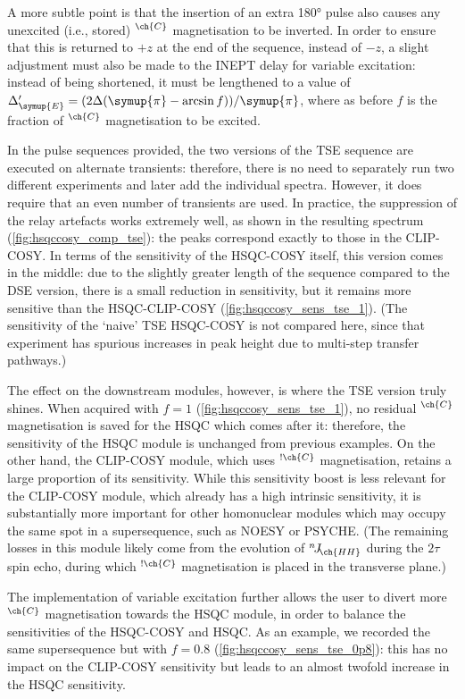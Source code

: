 \documentclass[a4paper,12pt]{article}
\newcommand{\DeltaE}{\Delta_{\symup{E}}}
\newcommand{\magn}[1]{\ch{^1H}$^{\ch{#1}}$}
\newcommand{\magnnot}[1]{\ch{^1H}$^{!\ch{#1}}$}
\newcommand{\nJ}[1]{{}^{n}\!J_{\!\ch{#1}}}
\newcommand{\cpi}{\symup{\pi}}
\begin{document}
\begin{refsection}
A more subtle point is that the insertion of an extra \ang{180} pulse also causes any unexcited (i.e., stored) \magn{C} magnetisation to be inverted.
In order to ensure that this is returned to $+z$ at the end of the sequence, instead of $-z$, a slight adjustment must also be made to the INEPT delay for variable excitation: instead of being shortened, it must be lengthened to a value of $\DeltaE' = (2\Delta (\cpi - \arcsin f))/\cpi$, where as before $f$ is the fraction of \magn{C} magnetisation to be excited.

In the pulse sequences provided, the two versions of the TSE sequence are executed on alternate transients: therefore, there is no need to separately run two different experiments and later add the individual spectra.
However, it does require that an even number of transients are used.
In practice, the suppression of the relay artefacts works extremely well, as shown in the resulting spectrum (\cref{fig:hsqccosy_comp_tse}): the peaks correspond exactly to those in the CLIP-COSY.
In terms of the sensitivity of the HSQC-COSY itself, this version comes in the middle: due to the slightly greater length of the sequence compared to the DSE version, there is a small reduction in sensitivity, but it remains more sensitive than the HSQC-CLIP-COSY (\cref{fig:hsqccosy_sens_tse_1}).
(The sensitivity of the `naive' TSE HSQC-COSY is not compared here, since that experiment has spurious increases in peak height due to multi-step transfer pathways.)

The effect on the downstream modules, however, is where the TSE version truly shines.
When acquired with $f = 1$ (\cref{fig:hsqccosy_sens_tse_1}), no residual \magn{C} magnetisation is saved for the HSQC which comes after it: therefore, the sensitivity of the HSQC module is unchanged from previous examples.
On the other hand, the CLIP-COSY module, which uses \magnnot{C} magnetisation, retains a large proportion of its sensitivity.
While this sensitivity boost is less relevant for the CLIP-COSY module, which already has a high intrinsic sensitivity, it is substantially more important for other homonuclear modules which may occupy the same spot in a supersequence, such as NOESY or PSYCHE.
(The remaining losses in this module likely come from the evolution of $\nJ{HH}$ during the $2\tau$ spin echo, during which \magnnot{C} magnetisation is placed in the transverse plane.)

The implementation of variable excitation further allows the user to divert more \magn{C} magnetisation towards the HSQC module, in order to balance the sensitivities of the HSQC-COSY and HSQC.
As an example, we recorded the same supersequence but with $f = 0.8$ (\cref{fig:hsqccosy_sens_tse_0p8}): this has no impact on the CLIP-COSY sensitivity but leads to an almost twofold increase in the HSQC sensitivity.


\end{refsection}
\end{document}
